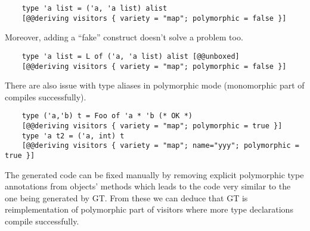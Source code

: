\begin{itemize}
\begin{lstlisting}
    type 'a list = ('a, 'a list) alist
    [@@deriving visitors { variety = "map"; polymorphic = false }]
    \end{lstlisting}
    Moreover, adding a ``fake'' construct doesn't solve a problem too.
    \begin{lstlisting}
    type 'a list = L of ('a, 'a list) alist [@@unboxed]
    [@@deriving visitors { variety = "map"; polymorphic = false }]
    \end{lstlisting}
    There are also issue with type aliases in polymorphic mode (monomorphic part of  compiles successfully).
    \begin{lstlisting}
    type ('a,'b) t = Foo of 'a * 'b (* OK *)
    [@@deriving visitors { variety = "map"; polymorphic = true }]
    type 'a t2 = ('a, int) t
    [@@deriving visitors { variety = "map"; name="yyy"; polymorphic = true }]
    \end{lstlisting}
    The generated code can be fixed manually by removing explicit polymorphic type annotations from objects' methods which leads to the code very similar to the one being generated by GT. From these we can deduce that GT is reimplementation of polymorphic part of visitors where more type declarations compile successfully.
\end{itemize}
